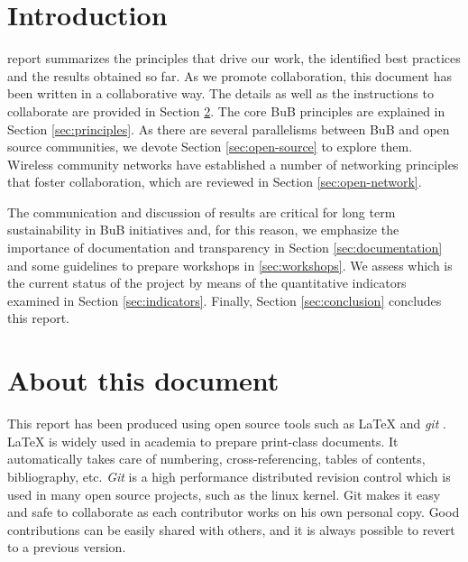 \documentclass[draftclsnofoot,12pt,journal,onecolumn]{IEEEtran}
\begin{document}
\section{Introduction}
% 
% 
% 
% 
 report summarizes the principles that drive our work, the identified best practices and the results obtained so far.
As we promote collaboration, this document has been written in a collaborative way. 
The details as well as the instructions to collaborate are provided in Section \ref{sec:about}.
The core BuB principles are explained in Section \ref{sec:principles}.
As there are several parallelisms between BuB and open source communities, we devote Section \ref{sec:open-source} to explore them.
Wireless community networks have established a number of networking principles that foster collaboration, which are reviewed in Section \ref{sec:open-network}.

The communication and discussion of results are critical for long term sustainability in BuB initiatives and, for this reason, we emphasize the importance of documentation and transparency in Section \ref{sec:documentation} and some guidelines to prepare workshops in \ref{sec:workshops}.
We assess which is the current status of the project by means of the quantitative indicators examined in Section \ref{sec:indicators}.
Finally, Section \ref{sec:conclusion} concludes this report.

\section{About this document}
\label{sec:about}

This report has been produced using open source tools such as {\LaTeX} \cite{lamport1994ldp} and \emph{git} \cite{chacon2009pg}.
{\LaTeX} is widely used in academia to prepare print-class documents.
It automatically takes care of numbering, cross-referencing, tables of contents, bibliography, etc.
\emph{Git} is a high performance distributed revision control which is used in many open source projects, such as the linux kernel.
Git makes it easy and safe to collaborate as each contributor works on his own personal copy.
Good contributions can be easily shared with others, and it is always possible to revert to a previous version.
\end{document}
